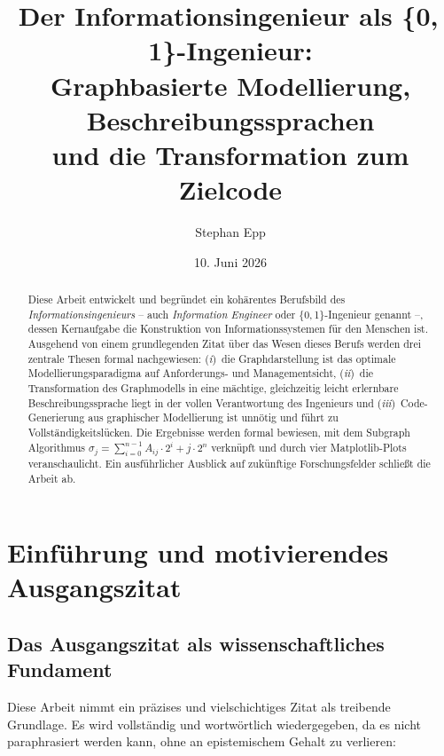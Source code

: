 ﻿\documentclass[a4paper,12pt]{article}
\title{\textbf{Der Informationsingenieur als \{0,\,1\}-Ingenieur:\\
Graphbasierte Modellierung, Beschreibungssprachen\\
und die Transformation zum Zielcode}}
\author{Stephan Epp}
\date{10. Juni 2026}
\theoremstyle{definition}
\begin{document}
\sloppy

\maketitle

\begin{abstract}
Diese Arbeit entwickelt und begründet ein kohärentes Berufsbild des \emph{Informationsingenieurs}
-- auch \emph{Information Engineer} oder \{0,\,1\}-Ingenieur genannt --,
dessen Kernaufgabe die Konstruktion von Informationssystemen für den Menschen ist.
Ausgehend von einem grundlegenden Zitat über das Wesen dieses Berufs werden
drei zentrale Thesen formal nachgewiesen:
(\emph{i})~die Graphdarstellung ist das optimale Modellierungsparadigma auf Anforderungs- und
Managementsicht,
(\emph{ii})~die Transformation des Graphmodells in eine mächtige, gleichzeitig leicht
erlernbare Beschreibungssprache liegt in der vollen Verantwortung des Ingenieurs und
(\emph{iii})~Code-Generierung aus graphischer Modellierung ist unnötig und führt zu
Vollständigkeitslücken.
Die Ergebnisse werden formal bewiesen, mit dem Subgraph Algorithmus
$\sigma_j = \sum_{i=0}^{n-1} A_{ij} \cdot 2^i + j \cdot 2^n$ verknüpft und durch vier
Matplotlib-Plots veranschaulicht. Ein ausführlicher Ausblick auf zukünftige Forschungsfelder
schließt die Arbeit ab.
\end{abstract}

\tableofcontents
\newpage

\section{Einführung und motivierendes Ausgangszitat}

\subsection{Das Ausgangszitat als wissenschaftliches Fundament}

Diese Arbeit nimmt ein präzises und vielschichtiges Zitat als treibende Grundlage. Es wird
vollständig und wortwörtlich wiedergegeben, da es nicht paraphrasiert werden kann, ohne an
epistemischem Gehalt zu verlieren:
\end{document}
